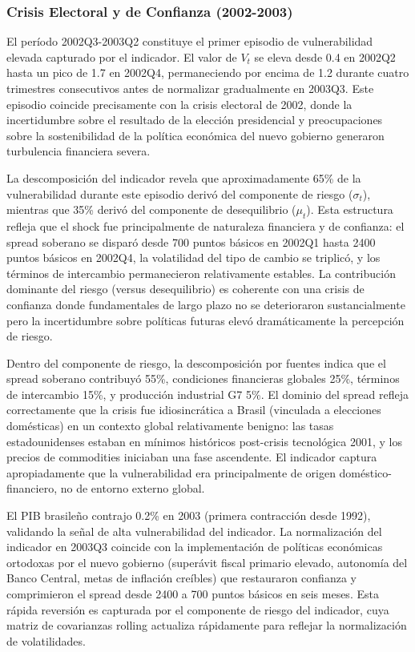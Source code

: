\documentclass[3p,11pt,draft,natbib=false]{elsarticle}
\begin{document}
\subsubsection{Crisis Electoral y de Confianza (2002-2003)}

El período 2002Q3-2003Q2 constituye el primer episodio de vulnerabilidad elevada capturado por el indicador. El valor de $V_t$ se eleva desde 0.4 en 2002Q2 hasta un pico de 1.7 en 2002Q4, permaneciendo por encima de 1.2 durante cuatro trimestres consecutivos antes de normalizar gradualmente en 2003Q3. Este episodio coincide precisamente con la crisis electoral de 2002, donde la incertidumbre sobre el resultado de la elección presidencial y preocupaciones sobre la sostenibilidad de la política económica del nuevo gobierno generaron turbulencia financiera severa.

La descomposición del indicador revela que aproximadamente 65\% de la vulnerabilidad durante este episodio derivó del componente de riesgo ($\sigma_t$), mientras que 35\% derivó del componente de desequilibrio ($\mu_t$). Esta estructura refleja que el shock fue principalmente de naturaleza financiera y de confianza: el spread soberano se disparó desde 700 puntos básicos en 2002Q1 hasta 2400 puntos básicos en 2002Q4, la volatilidad del tipo de cambio se triplicó, y los términos de intercambio permanecieron relativamente estables. La contribución dominante del riesgo (versus desequilibrio) es coherente con una crisis de confianza donde fundamentales de largo plazo no se deterioraron sustancialmente pero la incertidumbre sobre políticas futuras elevó dramáticamente la percepción de riesgo.

Dentro del componente de riesgo, la descomposición por fuentes indica que el spread soberano contribuyó 55\%, condiciones financieras globales 25\%, términos de intercambio 15\%, y producción industrial G7 5\%. El dominio del spread refleja correctamente que la crisis fue idiosincrática a Brasil (vinculada a elecciones domésticas) en un contexto global relativamente benigno: las tasas estadounidenses estaban en mínimos históricos post-crisis tecnológica 2001, y los precios de commodities iniciaban una fase ascendente. El indicador captura apropiadamente que la vulnerabilidad era principalmente de origen doméstico-financiero, no de entorno externo global.

El PIB brasileño contrajo 0.2\% en 2003 (primera contracción desde 1992), validando la señal de alta vulnerabilidad del indicador. La normalización del indicador en 2003Q3 coincide con la implementación de políticas económicas ortodoxas por el nuevo gobierno (superávit fiscal primario elevado, autonomía del Banco Central, metas de inflación creíbles) que restauraron confianza y comprimieron el spread desde 2400 a 700 puntos básicos en seis meses. Esta rápida reversión es capturada por el componente de riesgo del indicador, cuya matriz de covarianzas rolling actualiza rápidamente para reflejar la normalización de volatilidades.
\end{document}
